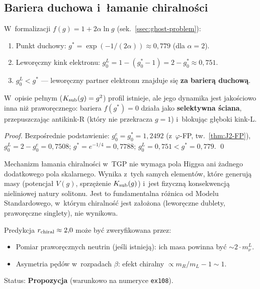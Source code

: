 \subsection{Bariera duchowa i~\l{}amanie chiralno\'sci}\label{app:K2-ghost}

\begin{theorem}\label{thm:K2-chiral-selection}
W~formalizacji $f(g) = 1 + 2\alpha\ln g$ (sek.~\ref{ssec:ghost-problem}):
\begin{enumerate}[nosep]
  \item Punkt duchowy: $g^* = \exp(-1/(2\alpha))
        \approx 0{,}779$ (dla $\alpha = 2$).
  \item Leworęczny kink elektronu: $g_0^L = 1 - (g_0^* - 1)
        = 2 - g_0^* \approx 0{,}751$.
  \item \textbf{$g_0^L < g^*$} --- leworęczny partner elektronu
        znajduje si\k{e} \textbf{za barier\k{a} duchow\k{a}}.
\end{enumerate}
W~opisie pe\l{}nym ($K_{\rm sub}(g) = g^2$) profil istnieje,
ale jego dynamika jest jako\'sciowo inna ni\.z prawor\k{e}cznego:
bariera $f(g^*) = 0$ dzia\l{}a jako \textbf{selektywna \'sciana},
przepuszczaj\k{a}c antikink-R (kt\'ory nie przekracza $g = 1$)
i~blokuj\k{a}c g\l{}\k{e}boki kink-L.
\end{theorem}

\begin{proof}
Bezpo\'srednie podstawienie:
$g_0^e = g_0^* = 1{,}2492$ (z~$\varphi$-FP, tw.~\ref{thm:J2-FP}),
$g_0^L = 2 - g_0^e = 0{,}7508$;
$g^* = e^{-1/4} = 0{,}7788$;
$g_0^L = 0{,}751 < g^* = 0{,}779$. \qed
\end{proof}

\begin{remark}\label{rem:K2-no-Higgs}
Mechanizm \l{}amania chiralno\'sci w~TGP nie wymaga pola Higgsa
ani \.zadnego dodatkowego pola ska\-lar\-ne\-go.
Wynika z~tych samych element\'ow, kt\'ore generuj\k{a} masy
(potencja\l{} $V(g)$, sprzę\.zenie $K_{\rm sub}(g)$)
i~jest fizyczn\k{a} konsekwencj\k{a} nieliniowej natury solitonu.
Jest to fundamentalna r\'o\.znica od Modelu Standardowego,
w~kt\'orym chiralno\'s\'c jest za\l{}o\.zona (leworęczne dublety,
praworęczne singlety), nie wynikowa.
\end{remark}

\begin{remark}[Falsyfikowalno\'s\'c]\label{rem:K2-falsyfikacja}
Predykcja $r_{\rm chiral} \approx 2{,}0$ mo\.ze by\'c
zweryfikowana przez:
\begin{itemize}[nosep]
  \item Pomiar prawor\k{e}cznych neutrin (je\'sli istniej\k{a}):
        ich masa powinna by\'c $\sim 2 \cdot m_\nu^L$.
  \item Asymetria p\k{e}d\'ow w~rozpadach $\beta$:
        efekt chiralny $\propto m_R/m_L - 1 \sim 1$.
\end{itemize}
Status: \textbf{Propozycja} (warunkowo na numeryce \texttt{ex108}).
\end{remark}
